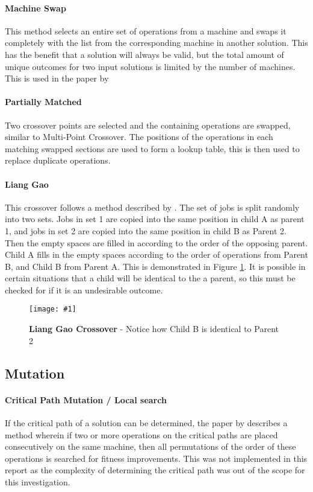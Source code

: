 \documentclass[14pt]{acmsiggraph}
\newcommand{\figuremacroW}[4]{
	\begin{figure}[h] %
		\centering
		\texttt{[image: \#1]}
		\caption[#2]{\textbf{#2} - #3}
		\label{fig:#1}
	\end{figure}
}
\begin{document}
	\paragraph{Machine Swap}
	This method selects an entire set of operations from a machine and swaps it completely with the list from the corresponding machine in another solution. This has the benefit that a solution will always be valid, but the total amount of unique outcomes  for two input solutions is limited by the number of machines. This is used in the paper by \cite{wang2012new}
	
	\paragraph{Partially Matched }
	Two crossover points are selected and the containing operations are swapped, similar to Multi-Point Crossover. The positions of the operations in each matching swapped sections are used to form a lookup table, this is then used to replace duplicate operations.  \cite{sivanandam2007introduction}
	
	\paragraph{Liang Gao}
	This crossover follows a method described by \cite{gao2011efficient}. The set of jobs is split randomly into two sets. Jobs in set 1 are copied into the same position in child A as parent 1, and jobs in set 2 are copied into the same position in child B as Parent 2. Then the empty spaces are filled in according to the order of the opposing parent. Child A fills in the empty spaces according to the order of operations from Parent B, and Child B from Parent A. This is demonstrated in Figure \ref{fig:cx}. It is possible in certain situations that a child will be identical to the a parent, so this must be checked for if it is an undesirable outcome.
	
	\figuremacroW
	{cx}
	{Liang Gao Crossover}
	{Notice how Child B is identical to Parent 2}
	{1.0}
	
	\subsection{Mutation}\label{mutmethods}
	\paragraph {Critical Path Mutation / Local search}
	If the critical path of a solution can be determined, the paper by \cite{gao2011efficient} describes a method wherein if two or more operations on the critical paths are placed consecutively on the same machine, then all permutations of the order of these operations is searched for fitness improvements. This was not implemented in this report as the complexity of determining the critical path was out of the scope for this investigation.
	
\end{document}
